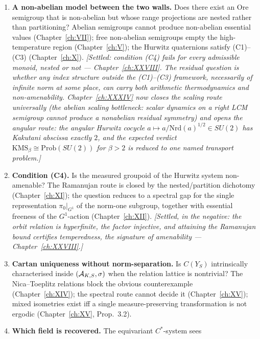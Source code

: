 \begin{enumerate}
\item \textbf{A non-abelian model between the two walls.} Does there exist an Ore
      semigroup that is non-abelian but whose range projections are nested rather than
      partitioning? Abelian semigroups cannot produce non-abelian essential values
      (Chapter~\ref{ch:VII}); free non-abelian semigroups empty the high-temperature region
      (Chapter~\ref{ch:V}); the Hurwitz quaternions satisfy (C1)--(C3)
      (Chapter~\ref{ch:X}). \emph{[Settled: condition (C4) fails for every admissible
      monoid, nested or not --- Chapter~\ref{ch:XXVIII}. The residual question is whether
      any index structure outside the (C1)--(C3) framework, necessarily of infinite norm
      at some place, can carry both arithmetic thermodynamics and non-amenability.
      Chapter~\ref{ch:XXXIV} now closes the scaling route universally (the abelian
      scaling bottleneck: scalar dynamics on a right LCM semigroup cannot produce a
      nonabelian residual symmetry) and opens the angular route: the angular Hurwitz
      cocycle $a\mapsto a/\mathrm{Nrd}(a)^{1/2}\in SU(2)$ has Kakutani abscissa exactly
      $2$, and the expected verdict $\mathrm{KMS}_\beta\cong\mathrm{Prob}(SU(2))$ for
      $\beta>2$ is reduced to one named transport problem.]}
\item \textbf{Condition (C4).} Is the measured groupoid of the Hurwitz system non-amenable?
      The Ramanujan route is closed by the nested/partition dichotomy
      (Chapter~\ref{ch:XI}); the question reduces to a spectral gap for the single
      representation $\pi_0|_{G^1}$ of the norm-one subgroup, together with essential
      freeness of the $G^1$-action (Chapter~\ref{ch:XII}). \emph{[Settled, in the
      negative: the orbit relation is hyperfinite, the factor injective, and attaining the
      Ramanujan bound certifies temperedness, the signature of amenability ---
      Chapter~\ref{ch:XXVIII}.]}
\item \textbf{Cartan uniqueness without norm-separation.} Is $C(Y_S)$ intrinsically
      characterised inside $(\mathcal{A}_{K,S},\sigma)$ when the relation lattice is nontrivial?
      The Nica--Toeplitz relations block the obvious counterexample
      (Chapter~\ref{ch:XIV}); the spectral route cannot decide it
      (Chapter~\ref{ch:XV}); mixed isometries exist iff a single measure-preserving
      transformation is not ergodic (Chapter~\ref{ch:XV}, Prop.~3.2).
\item \textbf{Which field is recovered.} The equivariant $C^*$-system sees

\end{enumerate}
